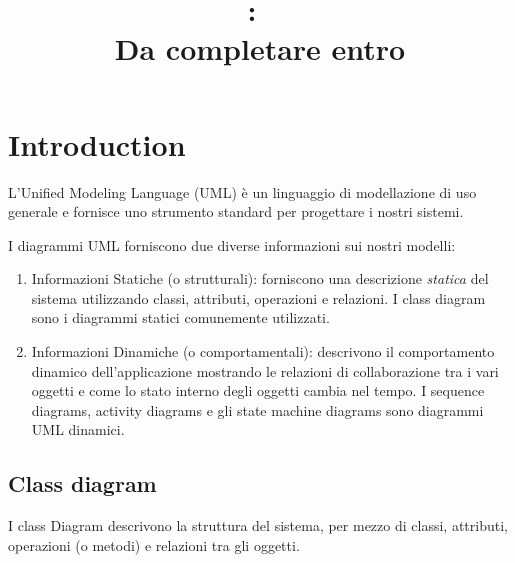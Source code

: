 \documentclass{article}
\title{
\vspace{2in}
\textmd{\textbf{\hmwkClass:\ \hmwkTitle}}\\
\normalsize\vspace{0.1in}\small{Da completare entro \hmwkDueDate}\\
\vspace{0.1in}\large{\textit{\hmwkClassInstructor}}
\vspace{3in}
}
\author{\textbf{\hmwkAuthorName}}
\date{} %
\begin{document}
\maketitle



\newpage
\tableofcontents
\newpage



\section{Introduction}
L'Unified Modeling Language (UML) \`e un linguaggio di modellazione di uso generale e fornisce uno strumento standard per progettare i nostri sistemi. 

I diagrammi UML forniscono due diverse informazioni sui nostri modelli:

\begin{enumerate}
\item Informazioni Statiche (o strutturali): forniscono una descrizione \emph{statica} del sistema utilizzando classi, attributi, operazioni e relazioni. I class diagram sono i diagrammi statici comunemente utilizzati.
\item Informazioni Dinamiche  (o comportamentali): descrivono il comportamento dinamico dell'applicazione mostrando le relazioni di collaborazione tra i vari oggetti e come lo stato interno degli oggetti cambia nel tempo. I sequence diagrams, activity diagrams e gli state machine diagrams sono diagrammi UML dinamici.
\end{enumerate}


\subsection{Class diagram}
I class Diagram descrivono la struttura del sistema, per mezzo di classi, attributi, operazioni (o metodi) e relazioni tra gli oggetti.\\
\end{document}
